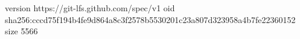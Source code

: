 version https://git-lfs.github.com/spec/v1
oid sha256:cccd75f194b4fe9d864a8c3f2578b5530201c23a807d323958a4b7fe22360152
size 5566
